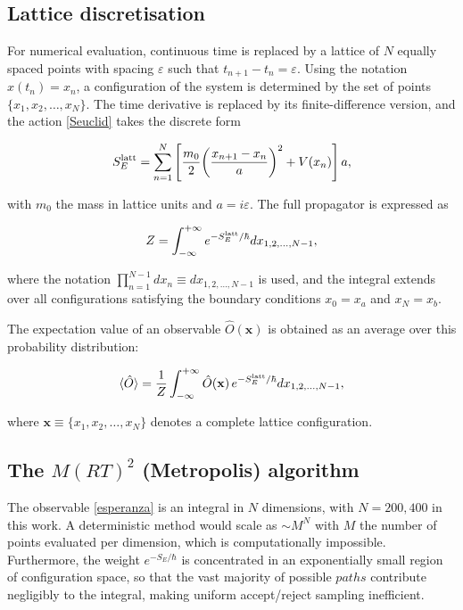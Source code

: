 \documentclass[11pt,a4paper,twoside,pdf]{article}
\numberwithin{equation}{section}
\begin{document}
\subsection{Lattice discretisation}
\label{red}


For numerical evaluation, continuous time is replaced by a lattice of $N$ equally spaced points with spacing $\varepsilon$ such that $t_{n+1} - t_n = \varepsilon$. Using the notation $x(t_n) = x_n$, a configuration of the system is determined by the set of points $\{x_1, x_2, \ldots, x_N\}$. The time derivative is replaced by its finite-difference version, and the action \ref{Seuclid} takes the discrete form

\begin{equation}
    S_E^{\rm latt} = \sum_{n=1}^{N} \left[ \frac{m_0}{2} \!\left( \frac{x_{n+1} - x_n}{a} \right)^2 + V(x_n) \right] a,
    \label{Slatt}
\end{equation}

with $m_0$ the mass in lattice units and $a=i\varepsilon$. The full propagator is expressed as

\begin{equation}
    Z = \int_{-\infty}^{+\infty} e^{-S_E^{\rm latt}/\hbar} dx_{ {1, 2, \ldots, N-1} },
\end{equation}

where the notation $\prod_{n=1}^{N-1} dx_n \equiv dx_{1, 2, \ldots, N-1}$ is used, and the integral extends over all configurations satisfying the boundary conditions $x_0 = x_{a}$ and $x_N = x_b$.

The expectation value of an observable $\hat{O}(\mathbf{x})$ is obtained as an average over this probability distribution:

\begin{equation}
    \braket{\hat{O}} = \frac{1}{Z} \int_{-\infty}^{+\infty} \hat{O}(\mathbf{x})\, e^{-S_E^{\rm latt}/\hbar} dx_{1, 2, \ldots, N-1},
    \label{esperanza}
\end{equation}

where $\mathbf{x} \equiv \{x_1, x_2, \ldots, x_N\}$ denotes a complete lattice configuration.




\subsection{The $M(RT)^2$ (Metropolis) algorithm}
\label{metropolis}


The observable \ref{esperanza} is an integral in $N$ dimensions, with $N = 200, 400$ in this work. A deterministic method would scale as $\sim M^N$ with $M$ the number of points evaluated per dimension, which is computationally impossible. Furthermore, the weight $e^{-S_E/\hbar}$ is concentrated in an exponentially small region of configuration space, so that the vast majority of possible $paths$ contribute negligibly to the integral, making uniform accept/reject sampling inefficient. \medskip
\end{document}
